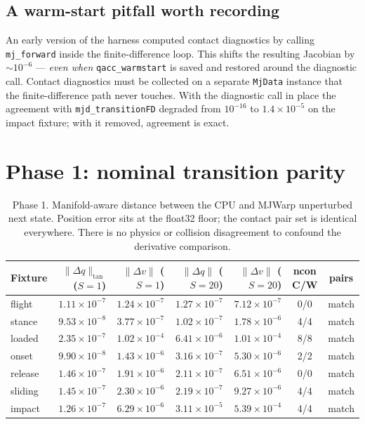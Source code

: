 \documentclass[11pt,a4paper]{article}
\newcommand{\code}[1]{\texttt{\small #1}}
\begin{document}
\subsection{A warm-start pitfall worth recording}
An early version of the harness computed contact diagnostics by calling \code{mj\_forward}
inside the finite-difference loop. This shifts the resulting Jacobian by $\sim$$10^{-6}$ ---
\emph{even when} \code{qacc\_warmstart} is saved and restored around the diagnostic call.
Contact diagnostics must be collected on a separate \code{MjData} instance that the
finite-difference path never touches. With the diagnostic call in place the agreement with
\code{mjd\_transitionFD} degraded from $10^{-16}$ to $1.4\times10^{-5}$ on the impact
fixture; with it removed, agreement is exact.

\section{Phase 1: nominal transition parity}

\begin{table}[htbp]
\centering
\footnotesize
\caption{Phase 1. Manifold-aware distance between the CPU and MJWarp unperturbed next state. Position error sits at the float32 floor; the contact pair set is identical everywhere. There is no physics or collision disagreement to confound the derivative comparison.}
\label{tab:phase1}
\begin{tabular}{lrrrrcc}
\toprule
\textbf{Fixture} & $\|\Delta q\|_{\mathrm{tan}}$ ($S{=}1$) & $\|\Delta v\|$ ($S{=}1$) & $\|\Delta q\|$ ($S{=}20$) & $\|\Delta v\|$ ($S{=}20$) & \textbf{ncon C/W} & \textbf{pairs} \\
\midrule
flight & $1.11\times10^{-7}$ & $1.24\times10^{-7}$ & $1.27\times10^{-7}$ & $7.12\times10^{-7}$ & 0/0 & match \\
stance & $9.53\times10^{-8}$ & $3.77\times10^{-7}$ & $1.02\times10^{-7}$ & $1.78\times10^{-6}$ & 4/4 & match \\
loaded & $2.35\times10^{-7}$ & $1.02\times10^{-4}$ & $6.41\times10^{-6}$ & $1.01\times10^{-4}$ & 8/8 & match \\
onset & $9.90\times10^{-8}$ & $1.43\times10^{-6}$ & $3.16\times10^{-7}$ & $5.30\times10^{-6}$ & 2/2 & match \\
release & $1.46\times10^{-7}$ & $1.91\times10^{-6}$ & $2.11\times10^{-7}$ & $6.51\times10^{-6}$ & 0/0 & match \\
sliding & $1.45\times10^{-7}$ & $2.30\times10^{-6}$ & $2.19\times10^{-7}$ & $9.27\times10^{-6}$ & 4/4 & match \\
impact & $1.26\times10^{-7}$ & $6.29\times10^{-6}$ & $3.11\times10^{-5}$ & $5.39\times10^{-4}$ & 4/4 & match \\
\bottomrule
\end{tabular}
\end{table}
\end{document}
